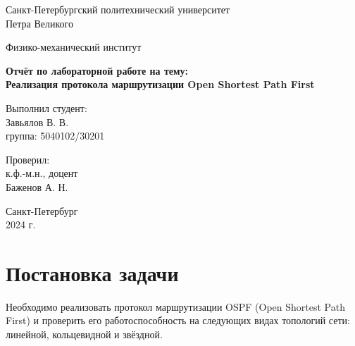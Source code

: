 \documentclass[a4paper,12pt]{article}
\begin{document}
\begin{titlepage}
    \begin{center}
        {\large Санкт-Петербургский политехнический университет\\Петра Великого}
    \end{center}
    
    \begin{center}
        {\large Физико-механический институт}
    \end{center}
    
    \vspace{8em}
    
    \begin{center}
        {\bfseries Отчёт по лабораторной работе на тему:\\ Реализация протокола маршрутизации Open Shortest Path First}
    \end{center}
    
    \vspace{4em}
    
    \begin{flushleft}
        \hspace{22em}Выполнил студент:\\
        \hspace{22em}Завьялов В. В.\\
        \hspace{22em}группа: 5040102/30201
        
        \vspace{2em}
        
        \hspace{22em}Проверил:\\
        \hspace{22em}к.ф.-м.н., доцент\\
        \hspace{22em}Баженов А. Н.
    \end{flushleft}
    
    \vspace{6em}
    
    \begin{center}
        Санкт-Петербург\\2024 г.
    \end{center}
    
\end{titlepage}

\tableofcontents

\newpage

\section{Постановка задачи}
Необходимо реализовать протокол маршрутизации OSPF (Open Shortest Path First) и проверить его работоспособность на следующих видах топологий сети: линейной, кольцевидной и звёздной.
\end{document}
